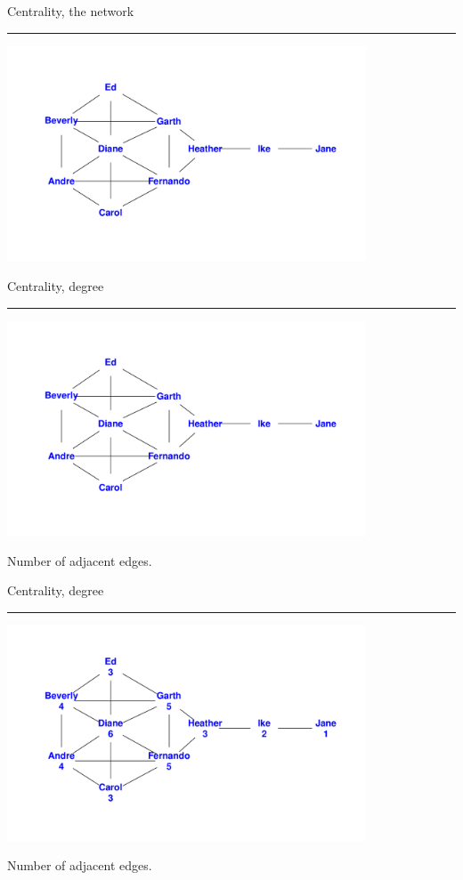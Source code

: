 \documentclass[landscape,fleqno]{foils}
\newcommand{\stitle}[1]{{\color{blue}\Large #1\par\vspace*{10pt}\hrule}}
\begin{document}
\newpage
\stitle{Centrality, the network}
\begin{center}
\includegraphics[width=0.8\textwidth]{centnet}
\end{center}    

\newpage
\stitle{Centrality, degree}
\begin{center}
\includegraphics[width=0.8\textwidth]{centnet}
\par Number of adjacent edges.
\end{center}

\newpage
\stitle{Centrality, degree}
\begin{center}
\includegraphics[width=0.8\textwidth]{centnet-degree}
\par Number of adjacent edges.
\end{center}
\end{document}
